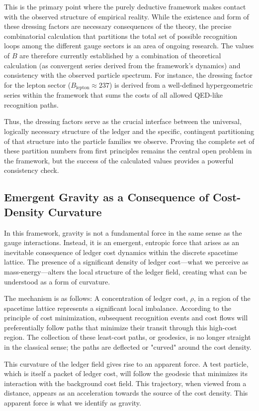\documentclass[11pt,a4paper]{article}
\begin{document}
This is the primary point where the purely deductive framework makes contact with the observed structure of empirical reality. While the existence and form of these dressing factors are necessary consequences of the theory, the precise combinatorial calculation that partitions the total set of possible recognition loops among the different gauge sectors is an area of ongoing research. The values of \(B\) are therefore currently established by a combination of theoretical calculation (as convergent series derived from the framework's dynamics) and consistency with the observed particle spectrum. For instance, the dressing factor for the lepton sector (\(B_{\text{lepton}} \approx 237\)) is derived from a well-defined hypergeometric series within the framework that sums the costs of all allowed QED-like recognition paths.

Thus, the dressing factors serve as the crucial interface between the universal, logically necessary structure of the ledger and the specific, contingent partitioning of that structure into the particle families we observe. Proving the complete set of these partition numbers from first principles remains the central open problem in the framework, but the success of the calculated values provides a powerful consistency check.

\subsection{Emergent Gravity as a Consequence of Cost-Density Curvature}
In this framework, gravity is not a fundamental force in the same sense as the gauge interactions. Instead, it is an emergent, entropic force that arises as an inevitable consequence of ledger cost dynamics within the discrete spacetime lattice. The presence of a significant density of ledger cost—what we perceive as mass-energy—alters the local structure of the ledger field, creating what can be understood as a form of curvature.

The mechanism is as follows: A concentration of ledger cost, \(\rho\), in a region of the spacetime lattice represents a significant local imbalance. According to the principle of cost minimization, subsequent recognition events and cost flows will preferentially follow paths that minimize their transit through this high-cost region. The collection of these least-cost paths, or geodesics, is no longer straight in the classical sense; the paths are deflected or "curved" around the cost density.

This curvature of the ledger field gives rise to an apparent force. A test particle, which is itself a packet of ledger cost, will follow the geodesic that minimizes its interaction with the background cost field. This trajectory, when viewed from a distance, appears as an acceleration towards the source of the cost density. This apparent force is what we identify as gravity.
\end{document}
